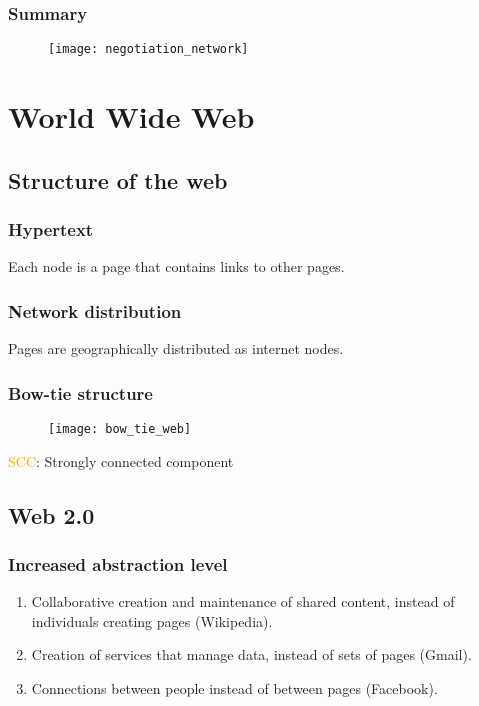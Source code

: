 \subsection{Summary}

\begin{figure}[H]
    \centering
    \texttt{[image: negotiation\_network]}
\end{figure}

\chapter{World Wide Web}

\section{Structure of the web}

\subsection{Hypertext}

Each node is a page that contains links to other pages.

\subsection{Network distribution}

Pages are geographically distributed as internet nodes.

\subsection{Bow-tie structure}

\begin{figure}[H]
    \centering
    \texttt{[image: bow\_tie\_web]}
\end{figure}

\textcolor{orange}{SCC}: Strongly connected component

\section{Web 2.0}

\subsection{Increased abstraction level}

\begin{enumerate}
\item Collaborative creation and maintenance of shared content, instead of individuals creating pages (Wikipedia).
\item Creation of services that manage data, instead of sets of pages (Gmail).
\item Connections between people instead of between pages (Facebook).
\end{enumerate}

